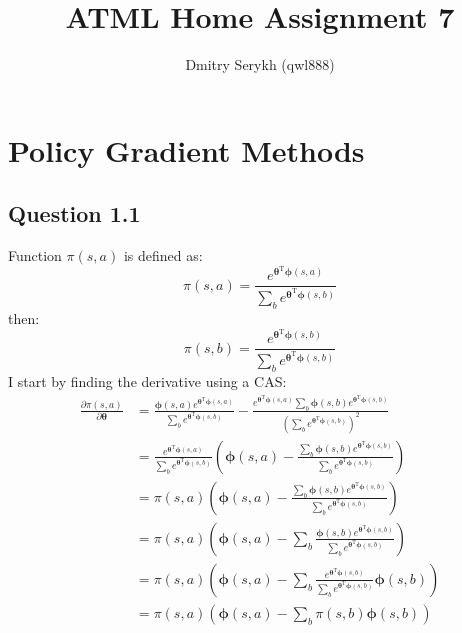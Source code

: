 \documentclass[a4paper]{article}
\title{\vspace{-5cm}ATML Home Assignment 7}
\author{Dmitry Serykh (qwl888)}
\newcommand*{\bs}[1]{\boldsymbol{#1}}
\begin{document}
\maketitle
\section{Policy Gradient Methods}
\label{sec:1}
\subsection*{Question 1.1}
\label{subsec:11}
Function $\pi(s,a)$ is defined as:
\[
\pi(s, a)=\frac{e^{\boldsymbol{\theta}^{\mathrm{T}} \boldsymbol{\phi}(s, a)}}
   {\sum_{b} e^{\boldsymbol{\theta}^{\mathrm{T}} \boldsymbol{\phi}(s, b)}}
\]
then:
\[
\pi(s, b)=\frac{e^{\boldsymbol{\theta}^{\mathrm{T}} \boldsymbol{\phi}(s, b)}}
   {\sum_{b} e^{\boldsymbol{\theta}^{\mathrm{T}} \boldsymbol{\phi}(s, b)}}
\]
I start by finding the derivative using a CAS:
\begin{align*}
  \frac{\partial \pi(s, a)}{\partial \bs{\theta}} &=
  \frac{\bs{\phi}(s,a) e^{\boldsymbol{\theta}^{\mathrm{T}} \boldsymbol{\phi}(s, a)}}
       {\sum_{b} e^{\boldsymbol{\theta}^{\mathrm{T}} \boldsymbol{\phi}(s, b)}}
  -
  \frac{e^{\boldsymbol{\theta}^{\mathrm{T}} \boldsymbol{\phi}(s, a)}
        \sum_{b} \boldsymbol{\phi}(s, b)e^{\boldsymbol{\theta}^{\mathrm{T}} \boldsymbol{\phi}(s, b)}}
       {(\sum_{b} e^{\boldsymbol{\theta}^{\mathrm{T}} \boldsymbol{\phi}(s, b)})^2}\\
       &=\frac{e^{\boldsymbol{\theta}^{\mathrm{T}} \boldsymbol{\phi}(s, a)}}
              {\sum_{b} e^{\boldsymbol{\theta}^{\mathrm{T}} \boldsymbol{\phi}(s, b)}}
         \left(
         \boldsymbol{\phi}(s, a)-
         \frac{\sum_{b} \boldsymbol{\phi}(s, b)e^{\boldsymbol{\theta}^{\mathrm{T}} \boldsymbol{\phi}(s, b)}}
              {\sum_{b} e^{\boldsymbol{\theta}^{\mathrm{T}} \boldsymbol{\phi}(s, b)}}
              \right)\\
  &=
   \pi(s, a)\left(
  \boldsymbol{\phi}(s, a)-
  \frac{\sum_{b} \boldsymbol{\phi}(s, b)e^{\boldsymbol{\theta}^{\mathrm{T}} \boldsymbol{\phi}(s, b)}}
       {\sum_{b} e^{\boldsymbol{\theta}^{\mathrm{T}} \boldsymbol{\phi}(s, b)}}
       \right)\\
  &=
   \pi(s, a)\left(
  \boldsymbol{\phi}(s, a)-
  \sum_{b} \frac{\boldsymbol{\phi}(s, b)e^{\boldsymbol{\theta}^{\mathrm{T}} \boldsymbol{\phi}(s, b)}}
       {\sum_{b} e^{\boldsymbol{\theta}^{\mathrm{T}} \boldsymbol{\phi}(s, b)}}
       \right)\\
  &=
  \pi(s, a)\left(
  \boldsymbol{\phi}(s, a)-
  \sum_{b} \frac{e^{\boldsymbol{\theta}^{\mathrm{T}} \boldsymbol{\phi}(s, b)}}
      {\sum_{b} e^{\boldsymbol{\theta}^{\mathrm{T}} \boldsymbol{\phi}(s, b)}
      }\boldsymbol{\phi}(s, b)
  \right)\\
  &=
  \pi(s, a)\left(
  \boldsymbol{\phi}(s, a)-
  \sum_{b}
  \pi(s, b)
  \boldsymbol{\phi}(s, b)
  \right)
\end{align*}
\end{document}
